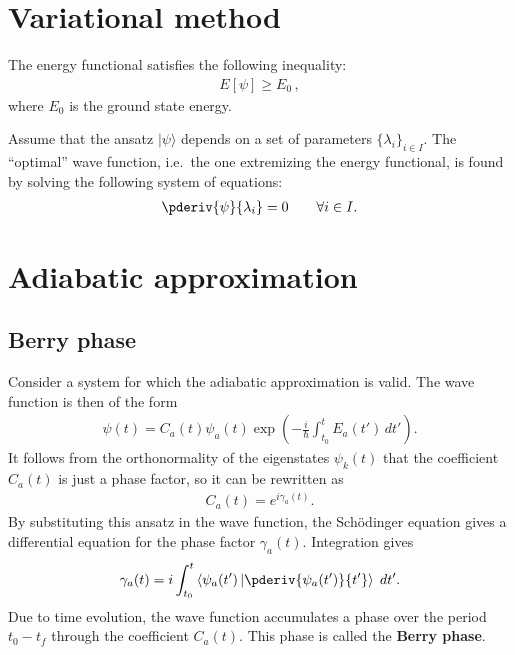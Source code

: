 \section{Variational method}


    \begin{property}
        The energy functional satisfies the following inequality:
        \begin{gather}
            E[\psi]\geq E_0\,,
        \end{gather}
        where $E_0$ is the ground state energy.
    \end{property}

    \begin{method}
        Assume that the ansatz $|\psi\rangle$ depends on a set of parameters $\{\lambda_i\}_{i\in I}$. The ``optimal'' wave function, i.e.~the one extremizing the energy functional, is found by solving the following system of equations:
        \begin{gather}
            \pderiv{\psi}{\lambda_i} = 0\qquad\forall i\in I.
        \end{gather}
    \end{method}

\section{Adiabatic approximation}
\subsection{Berry phase}

    Consider a system for which the adiabatic approximation is valid. The wave function is then of the form
    \begin{gather}
        \psi(t) = C_a(t)\psi_a(t)\exp\left(-\frac{i}{\hbar}\int_{t_0}^tE_a(t')\,dt'\right).
    \end{gather}
    It follows from the orthonormality of the eigenstates $\psi_k(t)$ that the coefficient $C_a(t)$ is just a phase factor, so it can be rewritten as
    \begin{gather}
        C_a(t) = e^{i\gamma_a(t)}.
    \end{gather}
    By substituting this ansatz in the wave function, the Sch\"odinger equation gives a differential equation for the phase factor $\gamma_a(t)$. Integration gives
    \begin{gather}
        \label{perturbation:phase_factor}
        \gamma_a(t) = i\int_{t_0}^t\left\langle\psi_a(t')\left|\pderiv{\psi_a(t')}{t'}\right\rangle\right.\,dt'.
    \end{gather}
    Due to time evolution, the wave function accumulates a phase over the period $t_0-t_f$ through the coefficient $C_a(t)$. This phase is called the \textbf{Berry phase}.


